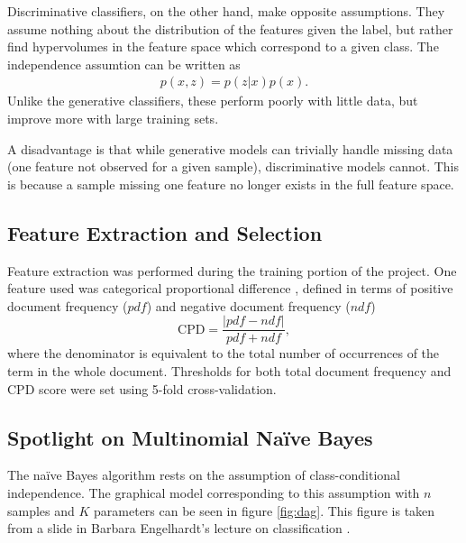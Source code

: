 \documentclass{article} %
\begin{document}
	Discriminative classifiers, on the other hand, make opposite assumptions. They assume nothing about the distribution of the features given the label, but rather find hypervolumes in the feature space which correspond to a given class. The independence assumtion can be written as 
	\begin{align}
	p(x,z) = p(z|x)p(x).
	\end{align}
	Unlike the generative classifiers, these perform poorly with little data, but improve more with large training sets. 
	
	A disadvantage is that while generative models can trivially handle missing data (one feature not observed for a given sample), discriminative models cannot. This is because a sample missing one feature no longer exists in the full feature space.
	
	\subsection{Feature Extraction and Selection}
	
	Feature extraction was performed during the training portion of the project. One feature used was categorical proportional difference \cite{oKeefe2009}, defined in terms of positive document frequency ($pdf$) and negative document frequency ($ndf$)
	\begin{equation}
	\mbox{CPD} = \frac{|pdf - ndf|}{pdf + ndf},
	\end{equation}
	where the denominator is equivalent to the total number of occurrences of the term in the whole document. Thresholds for both total document frequency and CPD score were set using 5-fold cross-validation.
	
	\subsection{Spotlight on Multinomial Na\"ive Bayes}
	
	The na\"ive Bayes algorithm rests on the assumption of class-conditional independence. The graphical model corresponding to this assumption with $n$ samples and $K$ parameters can be seen in figure \ref{fig:dag}. This figure is taken from a slide in Barbara Engelhardt's lecture on classification \cite{engelhardt17}.
	
\end{document}
